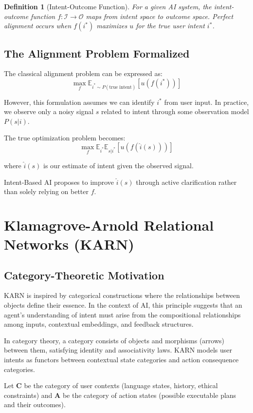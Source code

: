 \documentclass[12pt]{article}
\newtheorem{definition}{Definition}
\begin{document}
\begin{definition}[Intent-Outcome Function]
For a given AI system, the intent-outcome function $f: \mathcal{I} \rightarrow \mathcal{O}$ maps from intent space to outcome space. Perfect alignment occurs when $f(i^*)$ maximizes $u$ for the true user intent $i^*$.
\end{definition}

\subsection{The Alignment Problem Formalized}

The classical alignment problem can be expressed as:
$$\max_{f} \mathbb{E}_{i^* \sim P(\text{true intent})} [u(f(i^*))]$$

However, this formulation assumes we can identify $i^*$ from user input. In practice, we observe only a noisy signal $s$ related to intent through some observation model $P(s|i)$.

The true optimization problem becomes:
$$\max_{f} \mathbb{E}_{i^*} \mathbb{E}_{s|i^*} [u(f(\hat{i}(s)))]$$

where $\hat{i}(s)$ is our estimate of intent given the observed signal.

Intent-Based AI proposes to improve $\hat{i}(s)$ through active clarification rather than solely relying on better $f$.

\section{Klamagrove-Arnold Relational Networks (KARN)}

\subsection{Category-Theoretic Motivation}

KARN is inspired by categorical constructions where the relationships between objects define their essence. In the context of AI, this principle suggests that an agent's understanding of intent must arise from the compositional relationships among inputs, contextual embeddings, and feedback structures.

In category theory, a category consists of objects and morphisms (arrows) between them, satisfying identity and associativity laws. KARN models user intents as functors between contextual state categories and action consequence categories.

Let $\mathbf{C}$ be the category of user contexts (language states, history, ethical constraints) and $\mathbf{A}$ be the category of action states (possible executable plans and their outcomes).
\end{document}
